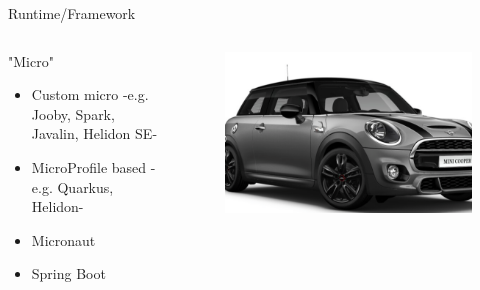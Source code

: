 \documentclass[aspectratio=169]{beamer}
\begin{document}
\begin{frame}{Runtime/Framework}

\begin{columns}
\begin{column}{0.5\textwidth}
"Micro"
\begin{itemize}
\item Custom micro -e.g. Jooby, Spark, Javalin, Helidon SE-
\item MicroProfile based -e.g. Quarkus, Helidon-
\item Micronaut
\item Spring Boot
\end{itemize}
\end{column}
\begin{column}{0.5\textwidth}  %
\begin{figure}
	\centering
	\includegraphics[width=0.9\linewidth]{Images/cooper}
\end{figure}
\end{column}
\end{columns}

\end{frame}
\end{document}
